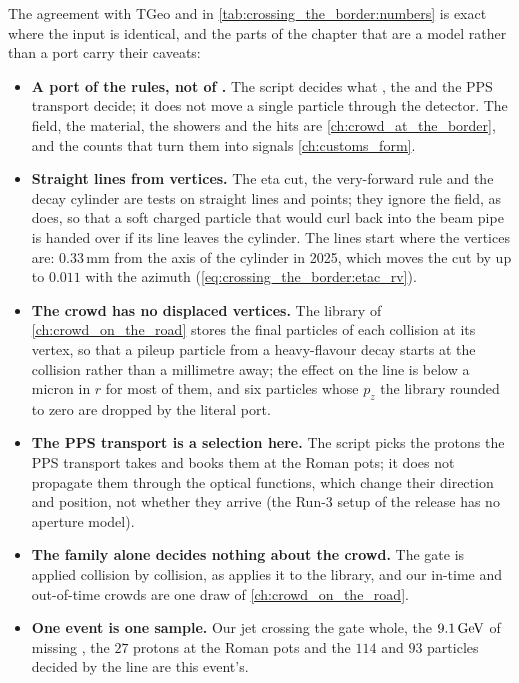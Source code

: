 The agreement with TGeo and \PYTHIA in \cref{tab:crossing_the_border:numbers}
is exact where the input is identical, and the parts of the chapter that
are a model rather than a port carry their caveats:
\begin{itemize}
  \item \textbf{A port of the rules, not of \GEANT.} The script decides what
    , the  and the PPS transport
    decide; it does not move a single particle through the detector. The
    field, the material, the showers and the hits are
    \cref{ch:crowd_at_the_border}, and the counts that turn them into
    signals \cref{ch:customs_form}.
  \item \textbf{Straight lines from vertices.} The eta cut, the
    very-forward rule and the decay cylinder are tests on straight lines and
    points; they ignore the field, as  does, so that a
    soft charged particle that would curl back into the beam pipe is handed
    over if its line leaves the cylinder. The lines start where the vertices
    are: $0.33$\,mm from the axis of the cylinder in 2025, which moves the
    cut by up to $0.011$ with the azimuth
    (\cref{eq:crossing_the_border:etac_rv}).
  \item \textbf{The crowd has no displaced vertices.} The library of
    \cref{ch:crowd_on_the_road} stores the final particles of each collision
    at its vertex, so that a pileup particle from a heavy-flavour decay starts
    at the collision rather than a millimetre away; the effect on the line is
    below a micron in $r$ for most of them, and six particles whose $p_z$ the
    library rounded to zero are dropped by the literal port.
  \item \textbf{The PPS transport is a selection here.} The script picks the
    protons the PPS transport takes and books them at the Roman pots; it does
    not propagate them through the optical functions, which change their
    direction and position, not whether they arrive (the Run-3 setup of the
    release has no aperture model).
  \item \textbf{The family alone decides nothing about the crowd.} The gate
    is applied collision by collision, as \CMSSW applies it to the library,
    and our in-time and out-of-time crowds are one draw of \cref{ch:crowd_on_the_road}.
  \item \textbf{One event is one sample.} Our jet crossing the gate whole, the
    $9.1\,\mathrm{GeV}$ of missing \pt, the $27$ protons at the Roman pots and the
    $114$ and $93$ particles decided by the line are this event's.
\end{itemize}

